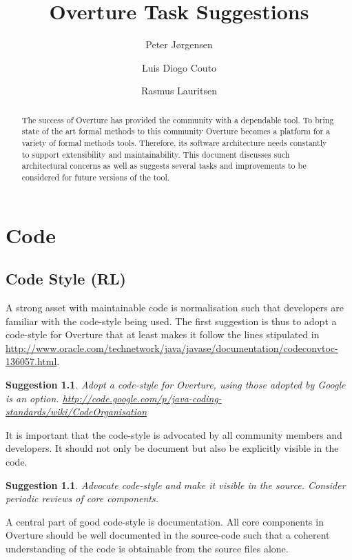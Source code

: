 \documentclass[11pt]{overturerep}
\title{Overture Task Suggestions}
\author{Peter J{\o}rgensen \and Luis Diogo Couto \and Rasmus Lauritsen}
\newtheorem{sug}[subsection]{Suggestion}
\begin{document}
\maketitle


\begin{abstract} 
    The success of Overture has provided the community with a dependable tool.
    To bring state of the art formal methods to this community Overture becomes
    a platform for a variety of formal methods tools.  Therefore, its software
    architecture needs constantly to support extensibility and maintainability.
    This document discusses such architectural concerns as well as suggests
    several tasks and improvements to be considered for future versions of the
    tool.  
\end{abstract}

\tableofcontents

\chapter{Code}

\section{Code Style (RL)} 
A strong asset with maintainable code is normalisation such that developers
are familiar with the code-style being used.  The first suggestion is thus
to adopt a code-style for Overture that at least makes it follow the lines
stipulated in
\url{http://www.oracle.com/technetwork/java/javase/documentation/codeconvtoc-136057.html}.

\begin{sug} 
    Adopt a code-style for Overture, using those adopted by Google
    is an option.
    \url{http://code.google.com/p/java-coding-standards/wiki/CodeOrganisation}
\end{sug}

It is important that the code-style is advocated by all community members
and developers. It should not only be document but also be explicitly
visible in the code.

\begin{sug} 
    Advocate code-style and make it visible in the source. Consider
    periodic reviews of core components.  
\end{sug}

A central part of good code-style is documentation. All core components
in Overture should be well documented in the source-code such that a
coherent understanding of the code is obtainable from the source files
alone.
\end{document}
